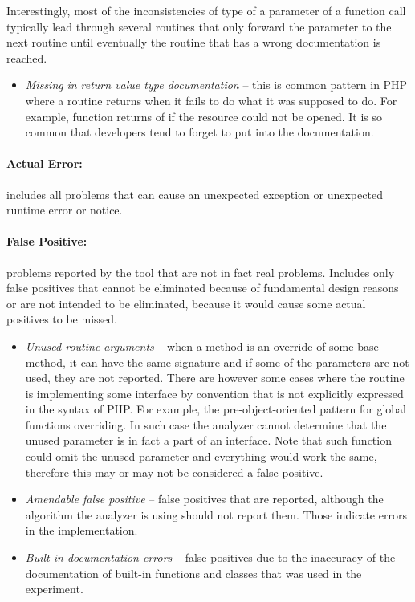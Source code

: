 Interestingly, most of the inconsistencies of type of a parameter 
of a function call typically lead through several routines that 
only forward the parameter to the next routine until 
eventually the routine that has a wrong documentation is reached.

\begin{itemize}
    \item[] \textit{Missing}  \textit{in return value type documentation} -- 
        this is common pattern in PHP where a routine returns  
        when it fails to do what it was supposed to do. For example, 
        function  returns  of  
        if the resource could not be opened. It is so common that 
        developers tend to forget to put  into the documentation.
\end{itemize}

\paragraph*{Actual Error:} includes all problems that can cause 
an unexpected exception or unexpected runtime error or notice.


\paragraph*{False Positive:} problems reported by the tool that 
are not in fact real problems. Includes only false positives 
that cannot be eliminated because of fundamental design reasons 
or are not intended to be eliminated, because it would 
cause some actual positives to be missed.


\begin{itemize}
    \item[] \textit{Unused routine arguments} -- when a method is an override of 
        some base method, it can have the same signature and if some of the 
        parameters are not used, they are not reported. There are however 
        some cases where the routine is implementing some interface by convention 
        that is not explicitly expressed in the syntax of PHP.
        For example, the pre-object-oriented pattern for global functions 
        overriding. In such case the analyzer cannot determine that the unused 
        parameter is in fact a part of an interface. Note that such function 
        could omit the unused parameter and everything would work the same, 
        therefore this may or may not be considered a false positive.
    \item[] \textit{Amendable false positive} -- false positives 
        that are reported, although the algorithm the analyzer 
        is using should not report them. Those indicate errors 
        in the implementation.
    \item[] \textit{Built-in documentation errors} -- false positives 
        due to the inaccuracy of the documentation of built-in 
        functions and classes that was used in the experiment.
\end{itemize}

